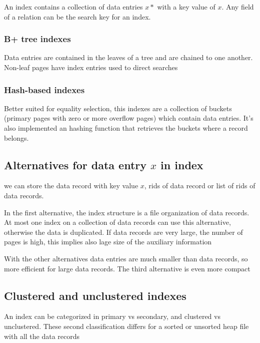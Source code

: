\documentclass[12pt, a4paper]{article}
\begin{document}
An index contains a collection of data entries $x*$ with a key value of $x$. Any field of a relation can be the
search key for an index.

\subsubsection{B+ tree indexes}
Data entries are contained in the leaves of a tree and are chained to one another. Non-leaf pages have index 
entries used to direct searches

\subsubsection{Hash-based indexes}
Better suited for equality selection, this indexes are a collection of buckets (primary pages with zero or more
overflow pages) which contain data entries. It's also implemented an hashing function that retrieves the buckets
where a record belongs. 

\subsection{Alternatives for data entry $x$ in index}
we can store the data record with key value $x$, rids of data record or list of rids of data records.

In the first alternative, the index structure is a file organization of data records. At most one index on a 
collection of data records can use this alternative, otherwise the data is duplicated. If data records are 
very large, the number of pages is high, this implies also lage size of the auxiliary information

With the other alternatives data entries are much smaller than data records, so more efficient for large data 
records. The third alternative is even more compact

\subsection{Clustered and unclustered indexes}
An index can be categorized in primary vs secondary, and clustered vs unclustered. These second classification
differs for a sorted or unsorted heap file with all the data records

\newpage
\end{document}
